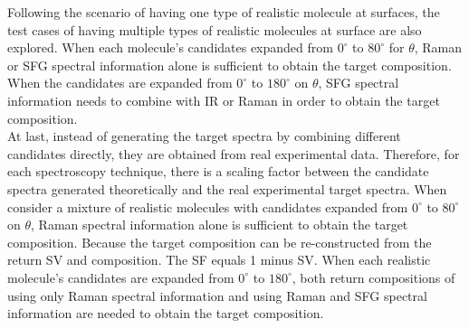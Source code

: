 Following the scenario of having one type of realistic molecule at surfaces, the test cases of having multiple types of realistic molecules at surface are also explored. When each molecule's candidates expanded from $0^{\circ}$ to $80^{\circ}$ for $\theta$, Raman or SFG spectral information alone is sufficient to obtain the target composition. When the candidates are expanded from $0^{\circ}$ to $180^{\circ}$ on $\theta$, SFG spectral information needs to combine with IR or Raman in order to obtain the target composition. \\

At last, instead of generating the target spectra by combining different candidates directly, they are obtained from real experimental data. Therefore, for each spectroscopy technique, there is a scaling factor between the candidate spectra generated theoretically and the real experimental target spectra. When consider a mixture of realistic molecules with candidates expanded from $0^{\circ}$ to $80^{\circ}$ on $\theta$, Raman spectral information alone is sufficient to obtain the target composition. Because the target composition can be re-constructed from the return SV and composition. The SF equals 1 minus SV. When each realistic molecule's candidates are expanded from $0^{\circ}$ to $180^{\circ}$, both return compositions of using only Raman spectral information and using Raman and SFG spectral information are needed to obtain the target composition. \\

